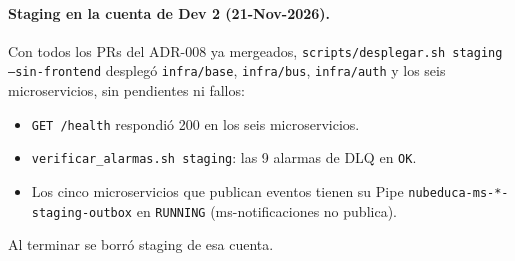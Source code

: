 \paragraph{Staging en la cuenta de Dev 2 (21-Nov-2026).}
Con todos los PRs del ADR-008 ya mergeados, \texttt{scripts/desplegar.sh staging --sin-frontend}
desplegó \texttt{infra/base}, \texttt{infra/bus}, \texttt{infra/auth} y los seis microservicios, sin
pendientes ni fallos:
\begin{itemize}
  \item \texttt{GET /health} respondió 200 en los seis microservicios.
  \item \texttt{verificar\_alarmas.sh staging}: las 9 alarmas de DLQ en \texttt{OK}.
  \item Los cinco microservicios que publican eventos tienen su Pipe
        \texttt{nubeduca-ms-*-staging-outbox} en \texttt{RUNNING} (ms-notificaciones no publica).
\end{itemize}
Al terminar se borró staging de esa cuenta.
